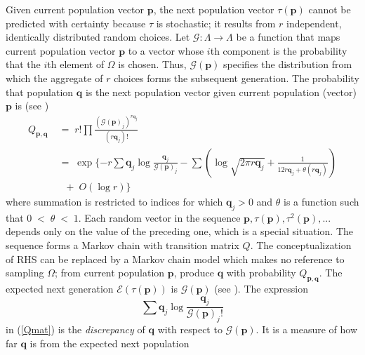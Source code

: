 Given current population vector $\bm{p}$, the next population vector $\tau(\bm{p})$ cannot 
be predicted with certainty because $\tau$ is stochastic; it results from $r$ independent, identically distributed random choices. 
Let $\mathcal{G}:\Lambda \rightarrow \Lambda$ be a function that maps 
current population vector $\bm{p}$ to a vector whose $i$th component 
is the probability that the $i$th element of $\Omega$ is chosen. Thus, $\mathcal{G}(\bm{p})$ 
specifies the distribution from which the aggregate 
of $r$ choices forms the subsequent generation. The probability that population $\bm{q}$ is 
the next population vector given current population (vector) $\bm{p}$ is (see \cite{Vose1999}) 
\begin{equation}
\label{Qmat}
\begin{split}
Q_{\bm{p},\bm{q}} & \;=\; r! \prod \frac{(\mathcal{G}(\bm{p})_j)^{r\bm{q}_j}}{(r\bm{q}_j)!} \\
& \;=\; \exp\{-r \sum \bm{q}_j \log \frac{\bm{q}_j}{\mathcal{G}(\bm{p})_j} - \sum (\log \sqrt{2 \pi r\bm{q}_j}  + \frac{1}{12r\bm{q}_j + \theta (r\bm{q}_j)}) \\      
& \;\;\; + \; O(\log r)\}
\end{split}
\end{equation}
where summation is restricted to indices for which $\bm{q}_j > 0$ and $\theta$ is a function such that $0 \;<\; \theta \;<\; 1$.
Each random vector in the sequence $\bm{p}, \tau(\bm{p}), \tau^2(\bm{p}),...$ depends only on the value of the preceding one, 
which is a special situation. The sequence forms a Markov chain with transition matrix $Q$. 
The conceptualization of RHS can be replaced by a Markov chain model which makes no reference to sampling $\Omega$; 
from current population $\bm{p}$, produce $\bm{q}$ with probability $Q_{\bm{p},\bm{q}}$. The expected next generation 
$\mathcal{E}(\tau (\bm{p}))$ is $\mathcal{G}(\bm{p})$ (see \cite{Vose1999}). The expression 
\[
\sum \bm{q}_j \log \frac{\bm{q}_j}{\mathcal{G}(\bm{p})_j!}
\]
in (\ref{Qmat}) is the {\em discrepancy} of $\bm{q}$ with respect to $\mathcal{G}(\bm{p})$. It is a measure of how far $\bm{q}$ is from the expected next population 
